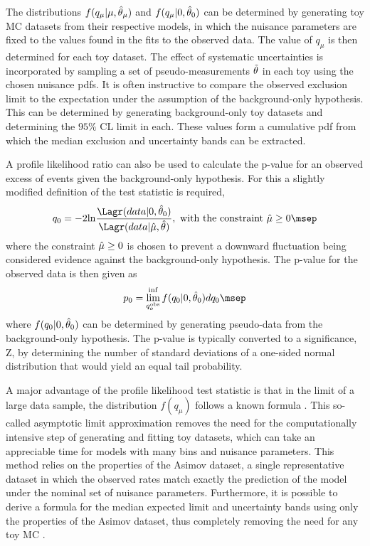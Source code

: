 The distributions $f(q_{\mu}|\mu,\Hat{\theta}_{\mu})$ and $f(q_{\mu}|0,\Hat{\theta}_0)$ can be determined by generating toy MC datasets from their respective models, in which the nuisance parameters are fixed to the values found in the fits to the observed data. The value of $q_{\mu}$ is then determined for each toy dataset. The effect of systematic uncertainties is incorporated by sampling a set of pseudo-measurements $\Tilde{\theta}$ in each toy using the chosen nuisance pdfs. It is often instructive to compare the observed exclusion limit to the expectation under the assumption of the background-only hypothesis. This can be determined by generating background-only toy datasets and determining the $95\%$ CL limit in each. These values form a cumulative pdf from which the median exclusion and uncertainty bands can be extracted.

A profile likelihood ratio can also be used to calculate the p-value for an observed excess of events given the background-only hypothesis. For this a slightly modified definition of the test statistic is required,
\begin{equation}
    q_0 = -2 \mathrm{ln}\frac{\Lagr(data|0, \Hat{\theta}_0)}{\Lagr(data|\Hat{\mu}, \Hat{\theta})}, \text{ with the constraint }\Hat{\mu} \geq 0\msep 
\end{equation}
where the constraint $\Hat{\mu} \geq 0$ is chosen to prevent a downward fluctuation being considered evidence against the background-only hypothesis. The p-value for the observed data is then given as
\begin{equation}
    p_0 = \lim^{\inf}_{q_o^{\mathrm{obs}}} f(q_0 | 0, \Hat{\theta}_0) dq_0\msep
\end{equation}
where $f(q_0 | 0, \Hat{\theta}_0)$ can be determined by generating pseudo-data from the background-only hypothesis. The p-value is typically converted to a significance, Z, by determining the number of standard deviations of a one-sided normal distribution that would yield an equal tail probability.

A major advantage of the profile likelihood test statistic is that in the limit of a large data sample, the distribution $f(q_{\mu})$ follows a known formula \cite{Carena2013}. This so-called asymptotic limit approximation removes the need for the computationally intensive step of generating and fitting toy datasets, which can take an appreciable time for models with many bins and nuisance parameters. This method relies on the properties of the Asimov dataset, a single representative dataset in which the observed rates match exactly the prediction of the model under the nominal set of nuisance parameters. Furthermore, it is possible to derive a formula for the median expected limit and uncertainty bands using only the properties of the Asimov dataset, thus completely removing the need for any toy MC \cite{Carena2013}.

